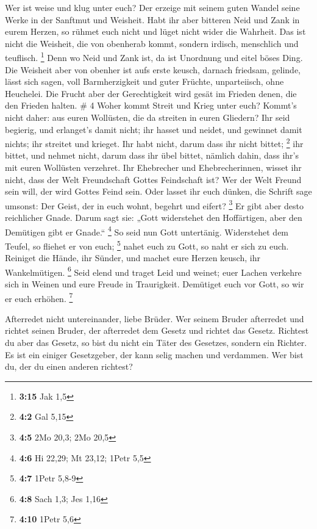  Wer ist weise und klug unter euch? Der erzeige mit seinem
guten Wandel seine Werke in der Sanftmut und Weisheit. 
Habt ihr aber bitteren Neid und Zank in eurem Herzen, so rühmet euch
nicht und lüget nicht wider die Wahrheit.  Das ist nicht
die Weisheit, die von obenherab kommt, sondern irdisch, menschlich und
teuflisch. \footnote{\textbf{3:15} Jak 1,5}  Denn wo Neid
und Zank ist, da ist Unordnung und eitel böses Ding.  Die
Weisheit aber von obenher ist aufs erste keusch, darnach friedsam,
gelinde, lässt sich sagen, voll Barmherzigkeit und guter Früchte,
unparteiisch, ohne Heuchelei.  Die Frucht aber der
Gerechtigkeit wird gesät im Frieden denen, die den Frieden halten. \# 4
 Woher kommt Streit und Krieg unter euch? Kommt's nicht
daher: aus euren Wollüsten, die da streiten in euren Gliedern?
 Ihr seid begierig, und erlanget's damit nicht; ihr hasset
und neidet, und gewinnet damit nichts; ihr streitet und krieget. Ihr
habt nicht, darum dass ihr nicht bittet; \footnote{\textbf{4:2} Gal 5,15}
 ihr bittet, und nehmet nicht, darum dass ihr übel bittet,
nämlich dahin, dass ihr's mit euren Wollüsten verzehret. 
Ihr Ehebrecher und Ehebrecherinnen, wisset ihr nicht, dass der Welt
Freundschaft Gottes Feindschaft ist? Wer der Welt Freund sein will, der
wird Gottes Feind sein.  Oder lasset ihr euch dünken, die
Schrift sage umsonst: Der Geist, der in euch wohnt, begehrt und eifert?
\footnote{\textbf{4:5} 2Mo 20,3; 2Mo 20,5}  Er gibt aber
desto reichlicher Gnade. Darum sagt sie: „Gott widerstehet den
Hoffärtigen, aber den Demütigen gibt er Gnade.`` \footnote{\textbf{4:6}
  Hi 22,29; Mt 23,12; 1Petr 5,5}  So seid nun Gott
untertänig. Widerstehet dem Teufel, so fliehet er von euch; \footnote{\textbf{4:7}
  1Petr 5,8-9}  nahet euch zu Gott, so naht er sich zu euch.
Reiniget die Hände, ihr Sünder, und machet eure Herzen keusch, ihr
Wankelmütigen. \footnote{\textbf{4:8} Sach 1,3; Jes 1,16} 
Seid elend und traget Leid und weinet; euer Lachen verkehre sich in
Weinen und eure Freude in Traurigkeit.  Demütiget euch vor
Gott, so wir er euch erhöhen. \footnote{\textbf{4:10} 1Petr 5,6}

 Afterredet nicht untereinander, liebe Brüder. Wer seinem
Bruder afterredet und richtet seinen Bruder, der afterredet dem Gesetz
und richtet das Gesetz. Richtest du aber das Gesetz, so bist du nicht
ein Täter des Gesetzes, sondern ein Richter.  Es ist ein
einiger Gesetzgeber, der kann selig machen und verdammen. Wer bist du,
der du einen anderen richtest?

